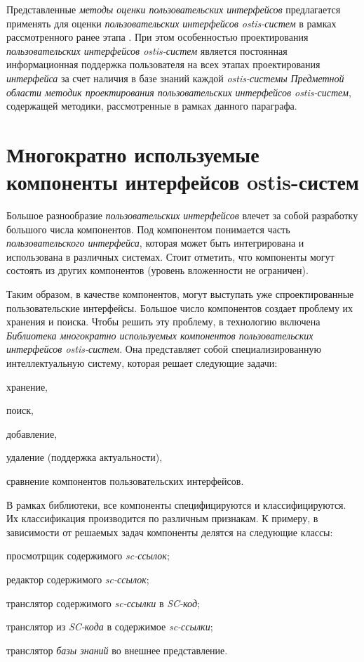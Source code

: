 {Представленные \textit{методы оценки пользовательских интерфейсов} предлагается применять для оценки \textit{пользовательских интерфейсов ostis-систем} в рамках рассмотренного ранее этапа . При этом особенностью проектирования \textit{пользовательских интерфейсов ostis-систем} является постоянная информационная поддержка пользователя на всех этапах проектирования \textit{интерфейса} за счет наличия в базе знаний каждой \textit{ostis-системы} \textit{Предметной области методик проектирования пользовательских интерфейсов ostis-систем}, содержащей методики, рассмотренные в рамках данного параграфа.


\section{Многократно используемые компоненты интерфейсов ostis-систем}
\label{sec_reusable_UI_components}

Большое разнообразие \textit{пользовательских интерфейсов} влечет за собой разработку большого числа компонентов. Под компонентом понимается часть \textit{пользовательского интерфейса}, которая может быть интегрирована и использована в различных системах.
Стоит отметить, что компоненты могут состоять из других компонентов (уровень вложенности не ограничен). 

Таким образом, в качестве компонентов, могут выступать уже спроектированные
пользовательские интерфейсы. Большое число компонентов создает проблему их хранения и поиска. Чтобы решить эту проблему, в технологию включена \textit{Библиотека многократно используемых компонентов пользовательских интерфейсов ostis-систем}. Она представляет собой специализированную интеллектуальную систему, которая решает следующие задачи:
\begin{textitemize}
	\item хранение,
	\item поиск,
	\item добавление,
	\item удаление (поддержка актуальности),
	\item сравнение компонентов пользовательских интерфейсов.
\end{textitemize}

В рамках библиотеки, все компоненты специфицируются и классифицируются. Их классификация производится по различным признакам. К примеру, в зависимости от решаемых задач компоненты делятся на следующие классы:

\begin{textitemize}
	\item просмотрщик содержимого \textit{sc-ссылок};
	\item редактор содержимого \textit{sc-ссылок};
	\item транслятор содержимого \textit{sc-ссылки} в \textit{SC-код};
	\item транслятор из \textit{SC-кода} в содержимое \textit{sc-ссылки};
	\item транслятор \textit{базы знаний} во внешнее представление.
\end{textitemize}

}
